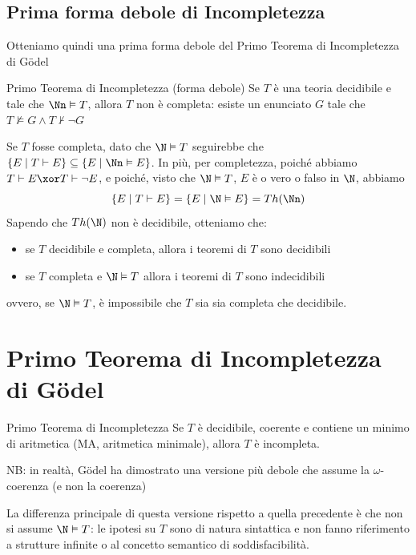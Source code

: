 \documentclass[a4paper,11pt]{report}
\begin{document}
\subsection{Prima forma debole di Incompletezza}
Otteniamo quindi una prima forma debole del Primo Teorema di Incompletezza di Gödel
\begin{thmframe}{Primo Teorema di Incompletezza (forma debole)}{}
    Se \( T \) è una teoria decidibile e tale che \( \Nn \vDash T \), allora \( T \) non è completa: esiste un enunciato \( G \) tale che \( T\not\vDash G \land T \not\vdash\neg G \)
\end{thmframe}
\begin{pframe}
    Se \( T \) fosse completa, dato che \( \N\vDash T \) seguirebbe che \( \{E \mid T\vdash E\} \subseteq \{E \mid \Nn \vDash E\} \). In più, per completezza, poiché abbiamo \( T\vdash E \xor T\vdash \neg E \), e poiché, visto che \( \N \vDash T \), \( E \) è o vero o falso in \( \N \), abbiamo
    \[  \{E \mid T\vdash E\} = \{E \mid \N \vDash E\} =Th(\Nn)  \]
    Sapendo che \( Th(\N) \) non è decidibile, otteniamo che:
    \begin{itemize}
        \item se \( T \) decidibile e completa, allora i teoremi di \( T \) sono decidibili
        \item se \( T \) completa e \( \N \vDash T \) allora i teoremi di \( T \) sono indecidibili
    \end{itemize}
    ovvero, se \( \N \vDash T \), è impossibile che \( T \) sia sia completa che decidibile.
\end{pframe}

\section{Primo Teorema di Incompletezza di Gödel}
\begin{thmframe}{Primo Teorema di Incompletezza}{}
    Se \( T \) è decidibile, coerente e contiene un minimo di aritmetica (MA, aritmetica minimale), allora \( T  \) è incompleta.

    \begin{gframe}{}
        NB: in realtà, Gödel ha dimostrato una versione più debole che assume la \( \omega\)-coerenza (e non la coerenza)
    \end{gframe}
\end{thmframe}

La differenza principale di questa versione rispetto a quella precedente è che non si assume \( \N \vDash T \): le ipotesi su \( T \) sono di natura sintattica e non fanno riferimento a strutture infinite o al concetto semantico di soddisfacibilità.
\end{document}
